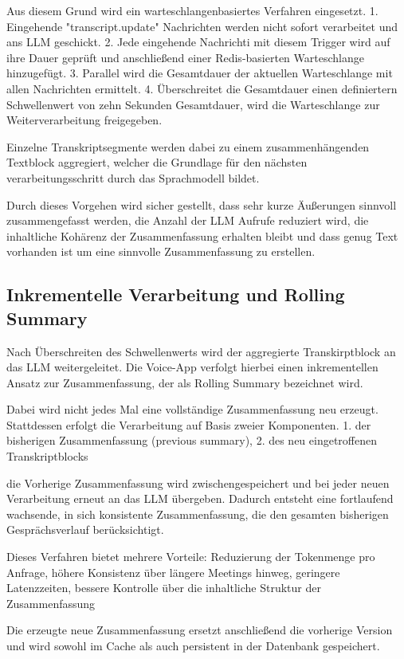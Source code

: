 Aus diesem Grund wird ein warteschlangenbasiertes Verfahren eingesetzt. 
1. Eingehende "transcript.update" Nachrichten werden nicht sofort verarbeitet und ans LLM geschickt. 
2. Jede eingehende Nachrichti mit diesem Trigger wird auf ihre Dauer geprüft und anschließend einer Redis-basierten Warteschlange hinzugefügt. 
3. Parallel wird die Gesamtdauer der aktuellen Warteschlange mit allen Nachrichten ermittelt.
4. Überschreitet die Gesamtdauer einen definiertern Schwellenwert von zehn Sekunden Gesamtdauer, wird die Warteschlange zur Weiterverarbeitung freigegeben. 

Einzelne Transkriptsegmente werden dabei zu einem zusammenhängenden Textblock aggregiert, welcher die Grundlage für den nächsten verarbeitungsschritt durch das Sprachmodell bildet. 

Durch dieses Vorgehen wird sicher gestellt, dass sehr kurze Äußerungen sinnvoll zusammengefasst werden, die Anzahl der LLM Aufrufe reduziert wird, die inhaltliche Kohärenz der Zusammenfassung erhalten bleibt und dass genug Text vorhanden ist um eine sinnvolle Zusammenfassung zu erstellen. 

\subsection{Inkrementelle Verarbeitung und Rolling Summary}
Nach Überschreiten des Schwellenwerts wird der aggregierte Transkirptblock an das LLM weitergeleitet. Die Voice-App verfolgt hierbei einen inkrementellen Ansatz zur Zusammenfassung, der als Rolling Summary bezeichnet wird. 

Dabei wird nicht jedes Mal eine vollständige Zusammenfassung neu erzeugt. Stattdessen erfolgt die Verarbeitung auf Basis zweier Komponenten. 
1. der bisherigen Zusammenfassung (previous summary), 
2. des neu eingetroffenen Transkriptblocks

die Vorherige Zusammenfassung wird zwischengespeichert und bei jeder neuen Verarbeitung erneut an das LLM übergeben. Dadurch entsteht eine fortlaufend wachsende, in sich konsistente Zusammenfassung, die den gesamten bisherigen Gesprächsverlauf berücksichtigt. 

Dieses Verfahren bietet mehrere Vorteile: Reduzierung der Tokenmenge pro Anfrage, höhere Konsistenz über längere Meetings hinweg, geringere Latenzzeiten, bessere Kontrolle über die inhaltliche Struktur der Zusammenfassung 

Die erzeugte neue Zusammenfassung ersetzt anschließend die vorherige Version und wird sowohl im Cache als auch persistent in der Datenbank gespeichert.


